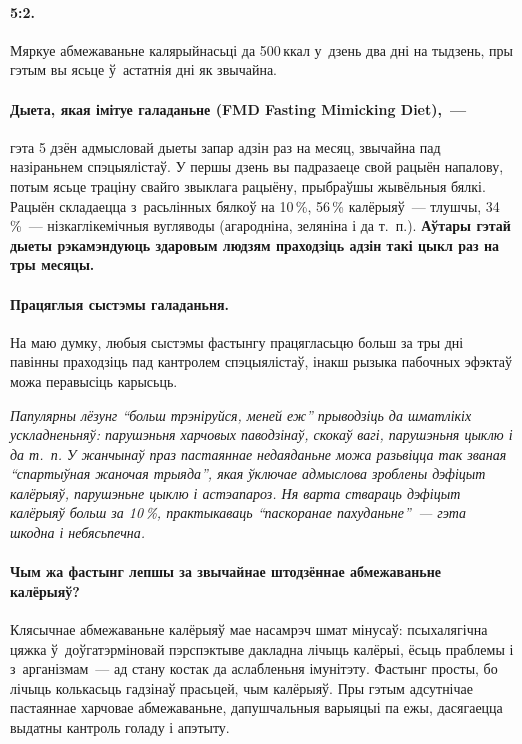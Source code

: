 \paragraph{5:2.} Мяркуе абмежаваньне калярыйнасьці да 500\,ккал у~дзень два дні на тыдзень, пры гэтым вы ясьце ў~астатнія дні як звычайна.

\paragraph{Дыета, якая імітуе галаданьне (FMD Fasting Mimicking Diet),~---} гэта 5 дзён адмысловай дыеты запар адзін раз на месяц, звычайна пад назіраньнем спэцыялістаў. У першы дзень вы падразаеце свой рацыён напалову, потым ясьце траціну свайго звыклага рацыёну, прыбраўшы жывёльныя бялкі. Рацыён складаецца з~расьлінных бялкоў на 10\,\%, 56\,\% калёрыяў~--- тлушчы, 34\,\%~--- нізкаглікемічныя вугляводы (агародніна, зеляніна і да т.~п.). \textbf{Аўтары гэтай дыеты рэкамэндуюць здаровым людзям праходзіць адзін такі цыкл раз на тры месяцы.}

\paragraph{Працяглыя сыстэмы галаданьня.} На маю думку, любыя сыстэмы фастынгу працягласьцю больш за тры дні павінны праходзіць пад кантролем спэцыялістаў, інакш рызыка пабочных эфэктаў можа перавысіць карысьць. 

\emph{Папулярны лёзунг ``больш трэніруйся, меней еж'' прыводзіць да шматлікіх ускладненьняў: парушэньня харчовых паводзінаў, скокаў вагі, парушэньня цыклю і да т.~п. У жанчынаў праз пастаяннае недаяданьне можа разьвіцца так званая ``спартыўная жаночая трыяда'', якая ўключае адмыслова зроблены дэфіцыт калёрыяў, парушэньне цыклю і астэапароз. Ня варта ствараць дэфіцыт калёрыяў больш за 10\,\%, практыкаваць ``паскоранае пахуданьне''~--- гэта шкодна і небясьпечна.}

\paragraph{Чым жа фастынг лепшы за звычайнае штодзённае абмежаваньне калёрыяў?} Клясычнае абмежаваньне калёрыяў мае насамрэч шмат мінусаў: псыхалягічна цяжка ў~доўгатэрміновай пэрспэктыве дакладна лічыць калёрыі, ёсьць праблемы і з~арганізмам~--- ад стану костак да аслабленьня імунітэту. Фастынг просты, бо лічыць колькасьць гадзінаў прасьцей, чым калёрыяў. Пры гэтым адсутнічае пастаяннае харчовае абмежаваньне, дапушчальныя варыяцыі па ежы, дасягаецца выдатны кантроль голаду і апэтыту.


